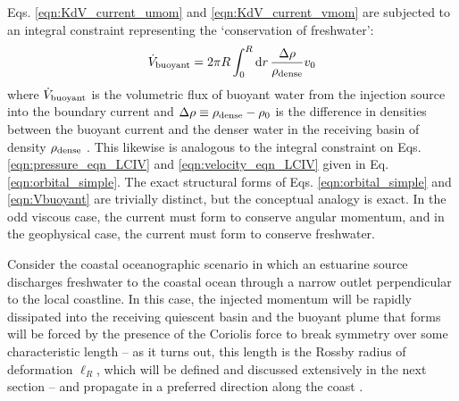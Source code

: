 \documentclass[%
 reprint,
superscriptaddress,
longbibliography,
 amsmath,amssymb,
 prl,
 citeautoscript,
]{revtex4-1}
\begin{document}
Eqs. \ref{eqn:KdV_current_umom} and \ref{eqn:KdV_current_vmom} are subjected to an integral constraint representing the `conservation of freshwater':
\begin{equation}
\dot{V}_{\rm buoyant} = 2 \pi R \int_0^R {\rm d} r \, \frac{\Delta \rho}{\rho_{\rm dense}} v_0
\label{eqn:Vbuoyant}
\end{equation}
where $\dot{V}_{\rm buoyant}$ is the volumetric flux of buoyant water from the injection source into the boundary current and $\Delta \rho \equiv \rho_{\rm dense} - \rho_0$ is the difference in densities between the buoyant current and the denser water in the receiving basin of density $\rho_{\rm dense}$ \cite{Alex_ARFM, Alex_JFM}. This likewise is analogous to the integral constraint on Eqs. \ref{eqn:pressure_eqn_LCIV} and \ref{eqn:velocity_eqn_LCIV} given in Eq. \ref{eqn:orbital_simple}. The exact structural forms of Eqs. \ref{eqn:orbital_simple} and \ref{eqn:Vbuoyant} are trivially distinct, but the conceptual analogy is exact. In the odd viscous case, the current must form to conserve angular momentum, and in the geophysical case, the current must form to conserve freshwater.

Consider the coastal oceanographic scenario in which an estuarine source discharges freshwater to the coastal ocean through a narrow outlet perpendicular to the local coastline. In this case, the injected momentum will be rapidly dissipated into the receiving quiescent basin and the buoyant plume that forms will be forced by the presence of the Coriolis force to break symmetry over some characteristic length -- as it turns out, this length is the Rossby radius of deformation $\ell_R$, which will be defined and discussed extensively in the next section -- and propagate in a preferred direction along the coast \cite{Alex_ARFM}.
\end{document}
